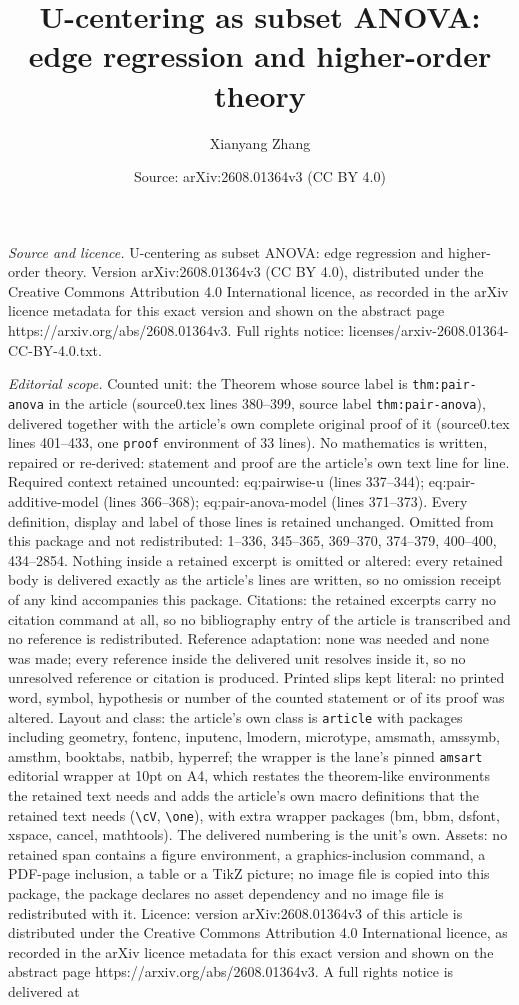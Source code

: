 \documentclass[10pt,a4paper]{amsart}
\title[U-centering as subset ANOVA: edge regression and higher-orde]{U-centering as subset ANOVA: edge regression and higher-order theory}
\author{Xianyang Zhang}
\date{Source: arXiv:2608.01364v3 (CC BY 4.0)}
\begin{document}
\maketitle

\noindent\emph{Source and licence.} U-centering as subset ANOVA: edge regression and higher-order theory. Version arXiv:2608.01364v3 (CC BY 4.0), distributed under the Creative Commons Attribution 4.0 International licence, as recorded in the arXiv licence metadata for this exact version and shown on the abstract page https://arxiv.org/abs/2608.01364v3. Full rights notice: licenses/arxiv-2608.01364-CC-BY-4.0.txt.\par\smallskip

\noindent\textit{Editorial scope.} Counted unit: the Theorem whose source label is \texttt{thm:pair-anova} in the article (source0.tex lines 380--399, source label \texttt{thm:pair-anova}), delivered together with the article's own complete original proof of it (source0.tex lines 401--433, one \texttt{proof} environment of 33 lines). No mathematics is written, repaired or re-derived: statement and proof are the article's own text line for line. Required context retained uncounted: eq:pairwise-u (lines 337--344); eq:pair-additive-model (lines 366--368); eq:pair-anova-model (lines 371--373). Every definition, display and label of those lines is retained unchanged. Omitted from this package and not redistributed: 1--336, 345--365, 369--370, 374--379, 400--400, 434--2854. Nothing inside a retained excerpt is omitted or altered: every retained body is delivered exactly as the article's lines are written, so no omission receipt of any kind accompanies this package. Citations: the retained excerpts carry no citation command at all, so no bibliography entry of the article is transcribed and no reference is redistributed. Reference adaptation: none was needed and none was made; every reference inside the delivered unit resolves inside it, so no unresolved reference or citation is produced. Printed slips kept literal: no printed word, symbol, hypothesis or number of the counted statement or of its proof was altered. Layout and class: the article's own class is \texttt{article} with packages including geometry, fontenc, inputenc, lmodern, microtype, amsmath, amssymb, amsthm, booktabs, natbib, hyperref; the wrapper is the lane's pinned \texttt{amsart} editorial wrapper at 10pt on A4, which restates the theorem-like environments the retained text needs and adds the article's own macro definitions that the retained text needs (\texttt{\textbackslash cV}, \texttt{\textbackslash one}), with extra wrapper packages (bm, bbm, dsfont, xspace, cancel, mathtools). The delivered numbering is the unit's own. Assets: no retained span contains a figure environment, a graphics-inclusion command, a PDF-page inclusion, a table or a TikZ picture; no image file is copied into this package, the package declares no asset dependency and no image file is redistributed with it. Licence: version arXiv:2608.01364v3 of this article is distributed under the Creative Commons Attribution 4.0 International licence, as recorded in the arXiv licence metadata for this exact version and shown on the abstract page https://arxiv.org/abs/2608.01364v3. A full rights notice is delivered at 
\end{document}
